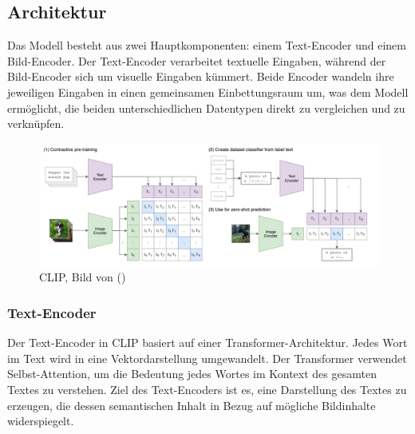 \documentclass[nolibertine, ngerman, algorithm, nomencl, minted]{ttlab-qualify}
\begin{document}
\subsection{Architektur}
Das Modell besteht aus zwei Hauptkomponenten: einem Text-Encoder und einem Bild-Encoder. Der Text-Encoder verarbeitet textuelle Eingaben, während der Bild-Encoder sich um visuelle Eingaben kümmert. Beide Encoder wandeln ihre jeweiligen Eingaben in einen gemeinsamen Einbettungsraum um, was dem Modell ermöglicht, die beiden unterschiedlichen Datentypen direkt zu vergleichen und zu verknüpfen.
\begin{figure}[h]
	\centering
	\includegraphics[scale=0.4]{static/CLIP.png}
	\caption{CLIP, Bild von (\cite{radford2021learning})}
	\label{fig:2.4}
\end{figure}
\subsubsection{Text-Encoder}
Der Text-Encoder in CLIP basiert auf einer Transformer-Architektur. Jedes Wort im Text wird in eine Vektordarstellung umgewandelt. Der Transformer verwendet Selbst-Attention, um die Bedeutung jedes Wortes im Kontext des gesamten Textes zu verstehen. Ziel des Text-Encoders ist es, eine Darstellung des Textes zu erzeugen, die dessen semantischen Inhalt in Bezug auf mögliche Bildinhalte widerspiegelt.
\end{document}
